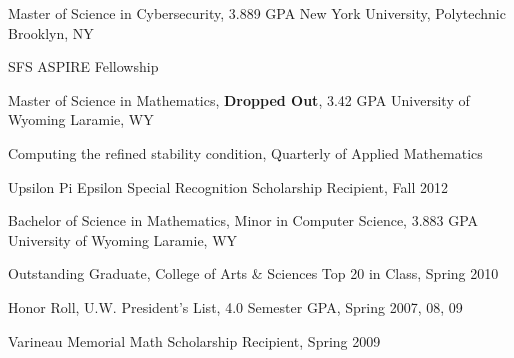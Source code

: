 


\begin{cventries}

\cventry
{Master of Science in Cybersecurity, 3.889 GPA} %
{New York University, Polytechnic} %
{Brooklyn, NY} %
{} %
{
\begin{cvitems}
\item {SFS ASPIRE Fellowship}
\end{cvitems}
}

\cventry
{Master of Science in Mathematics, \textbf{Dropped Out}, 3.42 GPA} %
{University of Wyoming} %
{Laramie, WY} %
{} %
{
\begin{cvitems}
\item{Computing the refined stability condition, Quarterly of Applied Mathematics}
\item {Upsilon Pi Epsilon Special Recognition Scholarship Recipient, Fall 2012}
\end{cvitems}
}

\cventry
{Bachelor of Science in Mathematics, Minor in Computer Science, 3.883 GPA} %
{University of Wyoming} %
{Laramie, WY} %
{} %
{
\begin{cvitems}
    \item {Outstanding Graduate, College of Arts \& Sciences Top 20 in Class, Spring 2010}
\begin{displaySection}
    \item {Honor Roll, U.W. President’s List, 4.0 Semester GPA, Spring 2007, 08, 09}
    \item {Varineau Memorial Math Scholarship Recipient, Spring 2009}
\end{displaySection}
\end{cvitems}
}


\end{cventries}